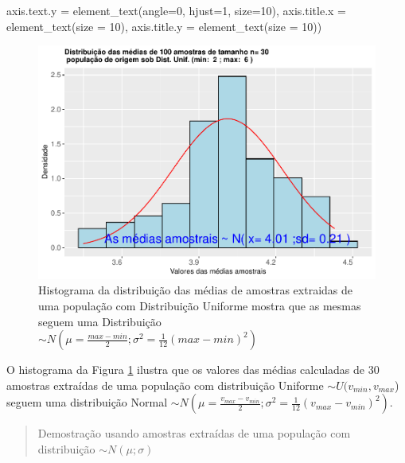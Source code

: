 \documentclass[
]{book}
\newenvironment{Shaded}{\begin{snugshade}}{\end{snugshade}}
\newcommand{\AttributeTok}[1]{\textcolor[rgb]{0.77,0.63,0.00}{#1}}
\newcommand{\DecValTok}[1]{\textcolor[rgb]{0.00,0.00,0.81}{#1}}
\newcommand{\FunctionTok}[1]{\textcolor[rgb]{0.00,0.00,0.00}{#1}}
\newcommand{\NormalTok}[1]{#1}
\begin{document}
\begin{Shaded}
\begin{Highlighting}[]
        \AttributeTok{axis.text.y =} \FunctionTok{element\_text}\NormalTok{(}\AttributeTok{angle=}\DecValTok{0}\NormalTok{, }\AttributeTok{hjust=}\DecValTok{1}\NormalTok{, }\AttributeTok{size=}\DecValTok{10}\NormalTok{),}
        \AttributeTok{axis.title.x =} \FunctionTok{element\_text}\NormalTok{(}\AttributeTok{size =} \DecValTok{10}\NormalTok{),}
        \AttributeTok{axis.title.y =} \FunctionTok{element\_text}\NormalTok{(}\AttributeTok{size =} \DecValTok{10}\NormalTok{))}
\end{Highlighting}
\end{Shaded}

\begin{figure}

{\centering \includegraphics[width=1\linewidth]{apostila_files/figure-latex/fig48-1} 

}

\caption{Histograma da distribuição das médias de amostras extraidas de uma população com Distribuição Uniforme mostra que as mesmas seguem uma Distribuição $\sim N (\mu= \frac{max-min}{2}; \sigma^2=\frac{1}{12}(max-min)^2)$}\label{fig:fig48}
\end{figure}

\hfill\break

O histograma da Figura \ref{fig:fig48} ilustra que os valores das médias calculadas de 30 amostras extraídas de uma população com distribuição Uniforme \(\sim U (v_{min}, v_{max}\)) seguem uma distribuição Normal \(\sim N (\mu= \frac{v_{max}-v_{min}}{2}; \sigma^2=\frac{1}{12}(v_{max}-v_{min})^2)\).

\hfill\break

\begin{quote}
Demostração usando amostras extraídas de uma população com distribuição \(\sim N (\mu;\sigma)\)
\end{quote}
\end{document}

